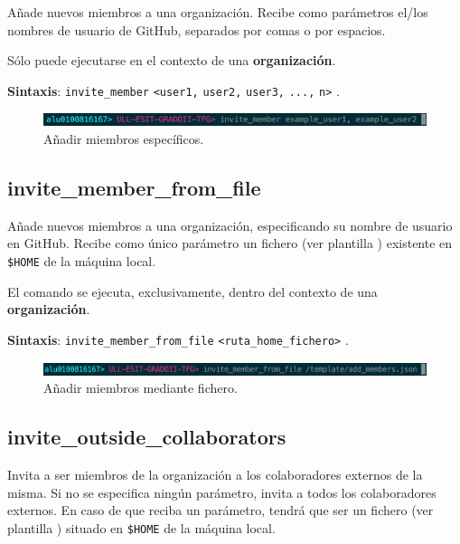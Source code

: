 Añade nuevos miembros a una organización. Recibe como parámetros el/los nombres de usuario de GitHub, separados por comas o por espacios.

Sólo puede ejecutarse en el contexto de una \textbf{organización}.

\textbf{Sintaxis}: \verb|invite_member| \verb|<user1,| \verb|user2,| \verb|user3,| \verb|...,| \verb|n>| .
 
\begin{figure}[H]
	\begin{center}
	\includegraphics[width=1\textwidth]{images/invite-member.png}
	\caption{Añadir miembros específicos.}
	\label{fig:invite-member}
	\end{center}
\end{figure}

\subsection{invite\_member\_from\_file}
\label{3.3.7}

Añade  nuevos miembros a una organización, especificando su nombre de usuario en GitHub. Recibe como único parámetro un fichero (ver plantilla \cite{B27}) existente en \verb|$HOME| de la máquina local. 

El comando se ejecuta, exclusivamente, dentro del contexto de una \textbf{organización}.

\textbf{Sintaxis}: \verb|invite_member_from_file| \verb|<ruta_home_fichero>| .

\begin{figure}[H]
	\begin{center}
	\includegraphics[width=1\textwidth]{images/add-members-file.png}
	\caption{Añadir miembros mediante fichero.}
	\label{fig:add-members-fil}
	\end{center}
\end{figure}

\subsection{invite\_outside\_collaborators}
\label{3.3.8}

Invita a ser miembros de la organización a los colaboradores externos de la misma. Si no se especifica ningún parámetro, invita a todos los colaboradores externos. En caso de que reciba un parámetro, tendrá que ser un fichero (ver plantilla \cite{B26}) situado en \verb|$HOME| de la máquina local.

